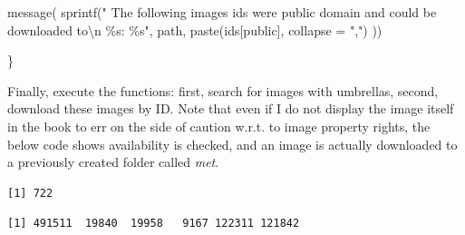 \documentclass[
  12pt,
  letterpaper,
]{krantz}
\newenvironment{Shaded}{\begin{snugshade}}{\end{snugshade}}
\newcommand{\AttributeTok}[1]{\textcolor[rgb]{0.40,0.45,0.13}{#1}}
\newcommand{\CommentTok}[1]{\textcolor[rgb]{0.37,0.37,0.37}{#1}}
\newcommand{\DecValTok}[1]{\textcolor[rgb]{0.68,0.00,0.00}{#1}}
\newcommand{\FunctionTok}[1]{\textcolor[rgb]{0.28,0.35,0.67}{#1}}
\newcommand{\NormalTok}[1]{\textcolor[rgb]{0.00,0.23,0.31}{#1}}
\newcommand{\OtherTok}[1]{\textcolor[rgb]{0.00,0.23,0.31}{#1}}
\newcommand{\SpecialCharTok}[1]{\textcolor[rgb]{0.37,0.37,0.37}{#1}}
\newcommand{\StringTok}[1]{\textcolor[rgb]{0.13,0.47,0.30}{#1}}
\begin{document}
\begin{Shaded}
\begin{Highlighting}[]
  \FunctionTok{message}\NormalTok{(}
    \FunctionTok{sprintf}\NormalTok{(}\StringTok{"}
\StringTok{    The following images ids were public}
\StringTok{    domain and could be downloaded to}\SpecialCharTok{\textbackslash{}n}\StringTok{ \%s: \%s"}\NormalTok{,}
\NormalTok{            path, }\FunctionTok{paste}\NormalTok{(ids[public], }\AttributeTok{collapse =} \StringTok{","}\NormalTok{)}
\NormalTok{  ))}
  
\NormalTok{\}}
\end{Highlighting}
\end{Shaded}

Finally, execute the functions: first, search for images with umbrellas,
second, download these images by ID. Note that even if I do not display
the image itself in the book to err on the side of caution w.r.t. to
image property rights, the below code shows availability is checked, and
an image is actually downloaded to a previously created folder called
\emph{met}.

\begin{Shaded}
\end{Shaded}

\begin{verbatim}
[1] 722
\end{verbatim}

\begin{Shaded}
\end{Shaded}

\begin{verbatim}
[1] 491511  19840  19958   9167 122311 121842
\end{verbatim}

\begin{Shaded}
\end{Shaded}
\end{document}
